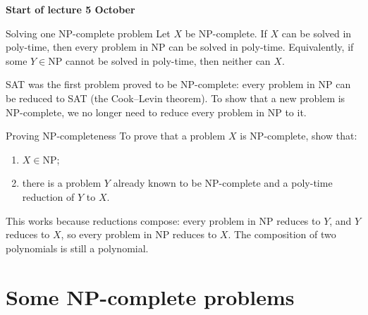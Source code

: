 \documentclass[a4paper,12pt,oneside]{report}
\newcommand{\lecturebanner}[1]{%
  \Needspace{6\baselineskip}%
  \begin{tcolorbox}[colback=yellow!20,colframe=yellow!60!black,
    boxrule=0.4pt,arc=1mm,left=5pt,right=5pt,top=3pt,bottom=3pt,
    before skip=6pt,after skip=6pt]
  \small\textbf{#1}
  \end{tcolorbox}}
\newcommand{\lecturestart}[1]{\lecturebanner{Start of lecture #1}}
\begin{document}
\lecturestart{5 October}

\begin{framedcor}{Solving one NP-complete problem}\label{cor:np-complete}
Let $X$ be NP-complete. If $X$ can be solved in poly-time, then every
problem in $\mathrm{NP}$ can be solved in poly-time. Equivalently, if
some $Y\in\mathrm{NP}$ cannot be solved in poly-time, then neither can
$X$.
\end{framedcor}

SAT was the first problem proved to be NP-complete: every problem in
$\mathrm{NP}$ can be reduced to SAT (the Cook--Levin theorem). To show
that a new problem is NP-complete, we no longer need to reduce every
problem in NP to it.

\begin{framedprop}{Proving NP-completeness}\label{prop:prove-npc}
To prove that a problem $X$ is NP-complete, show that:
\begin{enumerate}
  \item $X\in\mathrm{NP}$;
  \item there is a problem $Y$ already known to be NP-complete and a
    poly-time reduction of $Y$ to $X$.
\end{enumerate}
\end{framedprop}

This works because reductions compose: every problem in NP reduces to
$Y$, and $Y$ reduces to $X$, so every problem in NP reduces to $X$.
The composition of two polynomials is still a polynomial.

\begin{center}
\end{center}

\section{Some NP-complete problems}
\end{document}
